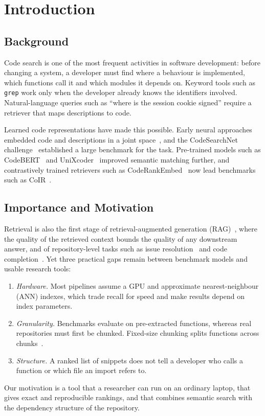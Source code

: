 \documentclass[conference]{IEEEtran}
\begin{document}
\section{Introduction}

\subsection{Background}
Code search is one of the most frequent activities in software development:
before changing a system, a developer must find where a behaviour is
implemented, which functions call it and which modules it depends on. Keyword
tools such as \texttt{grep} work only when the developer already knows the
identifiers involved. Natural-language queries such as ``where is the session
cookie signed'' require a retriever that maps descriptions to code.

Learned code representations have made this possible. Early neural approaches
embedded code and descriptions in a joint space~\cite{gu2018deep}, and the
CodeSearchNet challenge~\cite{husain2019codesearchnet} established a large
benchmark for the task. Pre-trained models such as CodeBERT~\cite{feng2020codebert}
and UniXcoder~\cite{guo2022unixcoder} improved semantic matching further, and
contrastively trained retrievers such as CodeRankEmbed~\cite{suresh2025cornstack}
now lead benchmarks such as CoIR~\cite{li2025coir}.

\subsection{Importance and Motivation}
Retrieval is also the first stage of retrieval-augmented generation
(RAG)~\cite{lewis2020rag}, where the quality of the retrieved context bounds the
quality of any downstream answer, and of repository-level tasks such as issue
resolution~\cite{jimenez2024swebench} and code completion~\cite{zhang2023repocoder}.
Yet three practical gaps remain between benchmark models and usable research
tools:
\begin{enumerate}
  \item \emph{Hardware.} Most pipelines assume a GPU and approximate
        nearest-neighbour (ANN) indexes, which trade recall for speed and make
        results depend on index parameters.
  \item \emph{Granularity.} Benchmarks evaluate on pre-extracted functions,
        whereas real repositories must first be chunked. Fixed-size chunking
        splits functions across chunks~\cite{zhang2025cast}.
  \item \emph{Structure.} A ranked list of snippets does not tell a developer
        who calls a function or which file an import refers to.
\end{enumerate}
Our motivation is a tool that a researcher can run on an ordinary laptop,
that gives exact and reproducible rankings, and that combines semantic search
with the dependency structure of the repository.
\end{document}
